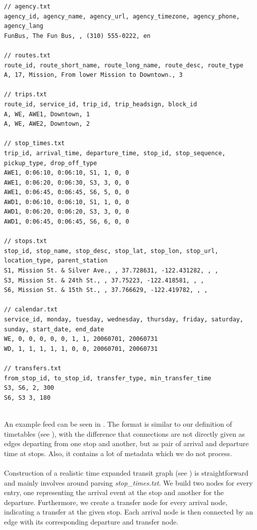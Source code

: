 		\begin{lstlisting}[caption={\gtfs example data set, inspired by \libref{gtfsExample}.},label={gtfsExample},style={GTFSStyle},mathescape={true},
		float,floatplacement=ht]
// agency.txt
agency_id, agency_name, agency_url, agency_timezone, agency_phone, agency_lang
FunBus, The Fun Bus, , (310) 555-0222, en

// routes.txt
route_id, route_short_name, route_long_name, route_desc, route_type
A, 17, Mission, From lower Mission to Downtown., 3

// trips.txt
route_id, service_id, trip_id, trip_headsign, block_id
A, WE, AWE1, Downtown, 1
A, WE, AWE2, Downtown, 2

// stop_times.txt
trip_id, arrival_time, departure_time, stop_id, stop_sequence, pickup_type, drop_off_type
AWE1, 0:06:10, 0:06:10, S1, 1, 0, 0
AWE1, 0:06:20, 0:06:30, S3, 3, 0, 0
AWE1, 0:06:45, 0:06:45, S6, 5, 0, 0
AWD1, 0:06:10, 0:06:10, S1, 1, 0, 0
AWD1, 0:06:20, 0:06:20, S3, 3, 0, 0
AWD1, 0:06:45, 0:06:45, S6, 6, 0, 0

// stops.txt
stop_id, stop_name, stop_desc, stop_lat, stop_lon, stop_url, location_type, parent_station
S1, Mission St. & Silver Ave., , 37.728631, -122.431282, , ,
S3, Mission St. & 24th St., , 37.75223, -122.418581, , ,
S6, Mission St. & 15th St., , 37.766629, -122.419782, , ,

// calendar.txt
service_id, monday, tuesday, wednesday, thursday, friday, saturday, sunday, start_date, end_date
WE, 0, 0, 0, 0, 0, 1, 1, 20060701, 20060731
WD, 1, 1, 1, 1, 1, 0, 0, 20060701, 20060731

// transfers.txt
from_stop_id, to_stop_id, transfer_type, min_transfer_time
S3, S6, 2, 300
S6, S3 3, 180
	\end{lstlisting}\quad\\
	An example feed can be seen in . The format is similar to our definition of timetables (see ),
	with the difference that connections are not directly given as edges departing from one stop and another, but as pair of arrival and
	departure time at stops. Also, it contains a lot of metadata which we do not process.\\\\
	Construction of a realistic time expanded transit graph (see ) is straightforward and mainly
	involves around parsing \textit{stop\_times.txt}. We build two nodes for every entry, one representing the arrival event at the stop
	and another for the departure. Furthermore, we create a transfer node for every arrival node, indicating a transfer at the given stop.
	Each arrival node is then connected by an edge with its corresponding departure and transfer node.
	
